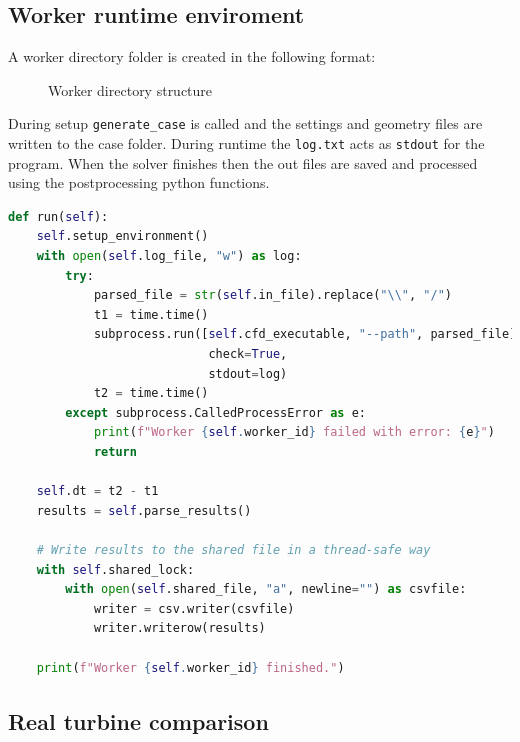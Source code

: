 \documentclass{article}
\begin{document}
\subsection{Worker runtime enviroment}

A worker directory folder is created in the following format:
\begin{figure}[H]
    \caption{Worker directory structure}
    \label{fig:worker_dir}
\end{figure}

During setup \texttt{generate\_case} is called and the settings and geometry files are written to the case folder.
During runtime the \texttt{log.txt} acts as \texttt{stdout} for the program.
When the solver finishes then the out files are saved and processed using the postprocessing python functions.

\begin{lstlisting}[language=Python]
def run(self):
    self.setup_environment()
    with open(self.log_file, "w") as log:
        try:
            parsed_file = str(self.in_file).replace("\\", "/")
            t1 = time.time()
            subprocess.run([self.cfd_executable, "--path", parsed_file],
                            check=True,
                            stdout=log)
            t2 = time.time()
        except subprocess.CalledProcessError as e:
            print(f"Worker {self.worker_id} failed with error: {e}")
            return

    self.dt = t2 - t1
    results = self.parse_results()

    # Write results to the shared file in a thread-safe way
    with self.shared_lock:
        with open(self.shared_file, "a", newline="") as csvfile:
            writer = csv.writer(csvfile)
            writer.writerow(results)

    print(f"Worker {self.worker_id} finished.")
\end{lstlisting}

\subsection{Real turbine comparison}
\end{document}
